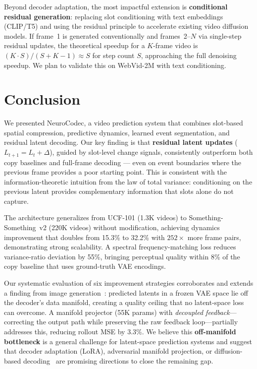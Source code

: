 \documentclass{article}
\newcommand{\method}{NeuroCodec}
\begin{document}
Beyond decoder adaptation, the most impactful extension is
\textbf{conditional residual generation}:
replacing slot conditioning with text embeddings (CLIP/T5) and using the
residual principle to accelerate existing video diffusion models.
If frame~1 is generated conventionally and frames~2--$N$ via
single-step residual updates, the theoretical speedup for a $K$-frame
video is $(K \cdot S) / (S + K - 1) \approx S$ for step count $S$,
approaching the full denoising speedup.
We plan to validate this on WebVid-2M with text conditioning.

\section{Conclusion}
\label{sec:conclusion}

We presented \method{}, a video prediction system that combines
slot-based spatial compression, predictive dynamics, learned event
segmentation, and residual latent decoding.
Our key finding is that \textbf{residual latent updates}
($L_{t+1} = L_t + \Delta$), guided by slot-level change signals,
consistently outperform both copy baselines and full-frame decoding ---
even on event boundaries where the previous frame provides a poor
starting point.
This is consistent with the information-theoretic intuition from the
law of total variance: conditioning on the previous latent provides
complementary information that slots alone do not capture.

The architecture generalizes from UCF-101 (1.3K videos) to
Something-Something~v2 (220K videos) without modification, achieving
dynamics improvement that doubles from 15.3\% to 32.2\% with
$252\times$ more frame pairs, demonstrating strong scalability.
A spectral frequency-matching loss reduces variance-ratio deviation
by 55\%, bringing perceptual quality within 8\% of the copy baseline
that uses ground-truth VAE encodings.

Our systematic evaluation of six improvement strategies corroborates
and extends a finding from image generation~\cite{zheng2025raedit}:
predicted latents in a frozen VAE space lie off the decoder's data
manifold, creating a quality ceiling that no latent-space loss can
overcome.
A manifold projector (55K params) with \emph{decoupled feedback}---correcting
the output path while preserving the raw feedback loop---partially
addresses this, reducing rollout MSE by 3.3\%.
We believe this \textbf{off-manifold bottleneck} is a general challenge
for latent-space prediction systems and suggest that decoder adaptation
(LoRA), adversarial manifold projection, or diffusion-based
decoding~\cite{heek2026unified} are promising directions to close
the remaining gap.
\end{document}
